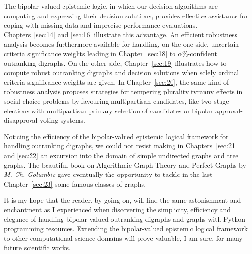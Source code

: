 The bipolar-valued epistemic logic, in which our decision algorithms are computing and expressing their decision solutions, provides effective assistance for coping with missing data and imprecise performance evaluations. Chapters~\ref{sec:14} and \ref{sec:16} illustrate this advantage. An efficient robustness analysis becomes furthermore available for handling, on the one side, uncertain criteria significance weights leading in Chapter~\ref{sec:18} to $\alpha\%$-confident outranking digraphs. On the other side, Chapter~\ref{sec:19} illustrates how to compute robust outranking digraphs and decision solutions when solely ordinal criteria significance weights are given. In Chapter~\ref{sec:20}, the same kind of robustness analysis proposes strategies for tempering plurality tyranny effects in social choice problems by favouring multipartisan candidates, like two-stage elections with multipartisan primary selection of candidates or bipolar approval-disapproval voting systems.

Noticing the efficiency of the bipolar-valued epistemic logical framework for handling outranking digraphs, we could not resist making in Chapters~\ref{sec:21} and \ref{sec:22} an excursion into the domain of simple undirected graphs and tree graphs. The beautiful book on Algorithmic Graph Theory and Perfect Graphs by \emph{M. Ch. Golumbic} gave eventually the opportunity to tackle in the last Chapter~\ref{sec:23} some famous classes of \Berge graphs.

It is my hope that the reader, by going on, will find the same astonishment and enchantment as I experienced when discovering the simplicity, efficiency and elegance of handling bipolar-valued outranking digraphs and graphs with Python programming resources. Extending the bipolar-valued epistemic logical framework to other computational science domains will prove valuable, I am sure, for many future scientific works. 

% 
% 
